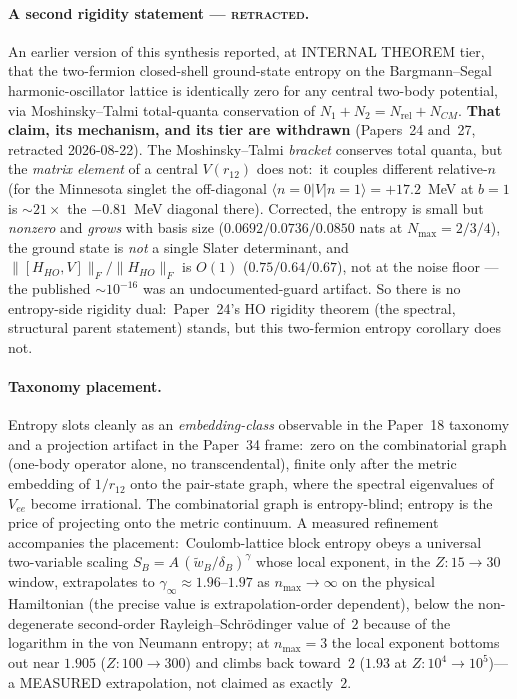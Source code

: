 \documentclass[aps,pra,twocolumn,superscriptaddress,longbibliography,nofootinbib]{revtex4-2}
\begin{document}
\paragraph{A second rigidity statement --- \textsc{retracted}.}
An earlier version of this synthesis reported, at INTERNAL THEOREM
tier, that the two-fermion closed-shell ground-state entropy on the
Bargmann--Segal harmonic-oscillator lattice is identically zero for
any central two-body potential, via Moshinsky--Talmi total-quanta
conservation of $N_1+N_2 = N_{\mathrm{rel}}+N_{CM}$.  \textbf{That
claim, its mechanism, and its tier are withdrawn} (Papers~24 and~27,
retracted 2026-08-22).  The Moshinsky--Talmi \emph{bracket} conserves
total quanta, but the \emph{matrix element} of a central $V(r_{12})$
does not:\ it couples different relative-$n$ (for the Minnesota singlet
the off-diagonal $\langle n{=}0|V|n{=}1\rangle = +17.2$~MeV at $b{=}1$ is
$\sim\!21\times$ the $-0.81$~MeV diagonal there).  Corrected, the entropy is
small but \emph{nonzero} and \emph{grows} with basis size
($0.0692/0.0736/0.0850$ nats at $N_{\max}=2/3/4$), the ground state is
\emph{not} a single Slater determinant, and
$\|[H_{HO},V]\|_F/\|H_{HO}\|_F$ is $O(1)$ ($0.75/0.64/0.67$), not at
the noise floor --- the published $\sim10^{-16}$ was an
undocumented-guard artifact.  So there is no entropy-side rigidity
dual:\ Paper~24's HO rigidity theorem (the spectral, structural parent
statement) stands, but this two-fermion entropy corollary does not.

\paragraph{Taxonomy placement.}
Entropy slots cleanly as an \emph{embedding-class} observable in the
Paper~18 taxonomy and a projection artifact in the Paper~34 frame:\ zero
on the combinatorial graph (one-body operator alone, no transcendental),
finite only after the metric embedding of $1/r_{12}$ onto the pair-state
graph, where the spectral eigenvalues of $V_{ee}$ become irrational.  The
combinatorial graph is entropy-blind; entropy is the price of projecting
onto the metric continuum.  A measured refinement accompanies the
placement:\ Coulomb-lattice block entropy obeys a universal two-variable
scaling $S_B = A\,(\tilde w_B/\delta_B)^\gamma$ whose local exponent,
in the $Z:15\to30$ window, extrapolates to $\gamma_\infty\approx1.96$--$1.97$
as $n_{\max}\to\infty$ on the physical Hamiltonian (the precise value is
extrapolation-order dependent), below the non-degenerate second-order
Rayleigh--Schr\"odinger value of~$2$ because of the logarithm in the von
Neumann entropy; at $n_{\max}=3$ the local exponent bottoms out near
$1.905$ ($Z:100\to300$) and climbs back toward~$2$ ($1.93$ at
$Z:10^4\to10^5$)---a
MEASURED extrapolation, not claimed as exactly~$2$.
\end{document}
